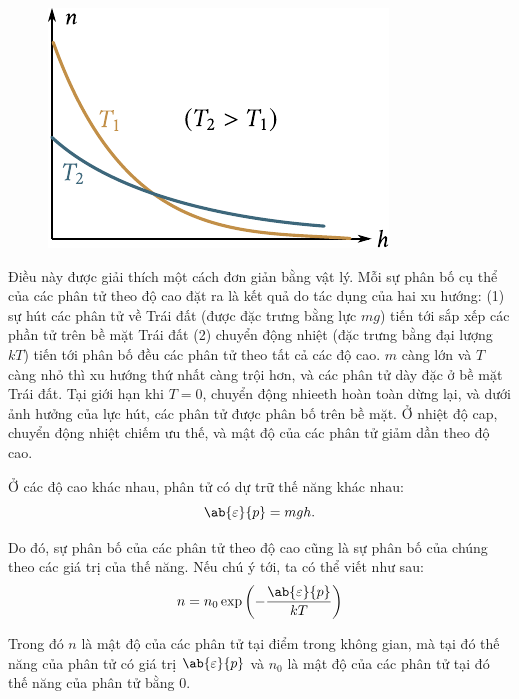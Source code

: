 \begin{figure}[!htb]
	\begin{center}
		\includegraphics[scale=1.0]{figures/ch_11/fig_11_22.pdf}
		\caption[]{}
		\label{fig:11_22}
	\end{center}
	\vspace{-0.5cm}
\end{figure}

Điều này được giải thích một cách đơn giản bằng vật lý. Mỗi sự phân bố cụ thể của các phân tử theo độ cao đặt ra là kết quả do tác dụng của hai xu hướng: (1) sự hút các phân tử về Trái đất (được đặc trưng bằng lực $mg$) tiến tới sắp xếp các phần tử trên bề mặt Trái đất (2) chuyển động nhiệt (đặc trưng bằng đại lượng $kT$) tiến tới phân bố đều các phân tử theo tất cả các độ cao.  $m$ càng lớn và $T$ càng nhỏ thì xu hướng thứ nhất càng trội hơn, và các phân tử dày đặc ở bề mặt Trái đất. Tại giới hạn khi $T=0$, chuyển động nhieeth hoàn toàn dừng lại, và dưới ảnh hưởng của lực hút, các phân tử được phân bố trên bề mặt. Ở nhiệt độ cap, chuyển động nhiệt chiếm ưu thế, và mật độ của các phân tử giảm dần theo độ cao.

Ở các độ cao khác nhau, phân tử có dự trữ thế năng khác nhau:
\begin{equation}\label{eq:11_76}
	\ab{\varepsilon}{p} = mgh.
\end{equation}

\noindent
Do đó, sự phân bố của các phân tử theo độ cao cũng là sự phân bố của chúng theo các giá trị của thế năng. Nếu chú ý tới, ta có thể viết  như sau:
\begin{equation}\label{eq:11_77}
	n = n_0 \exp\left(-\frac{\ab{\varepsilon}{p}}{kT}\right)
\end{equation}

\noindent
Trong đó $n$ là mật độ của các phân tử tại điểm trong không gian, mà tại đó thế năng của phân tử có giá trị $\ab{\varepsilon}{p}$ và $n_0$ là mật độ của các phân tử tại đó thế năng của phân tử bằng 0.

